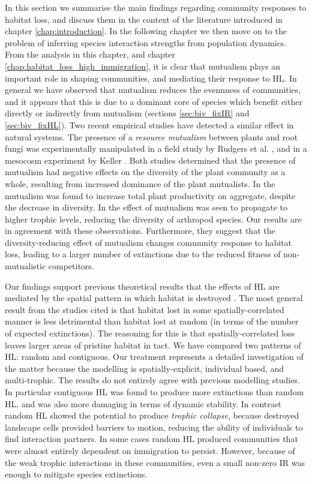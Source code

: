 In this section we summarise the main findings regarding community responses to habitat loss, and discuss them in the context of the literature introduced in chapter \ref{chap:introduction}. In the following chapter we then move on to the problem of inferring species interaction strengths from population dynamics. From the analysis in this chapter, and chapter \ref{chap:habitat_loss_high_immigration}, it is clear that mutualism plays an important role in shaping communities, and mediating their response to HL. In general we have observed that mutualism reduces the evennness of communities, and it appears that this is due to a dominant core of species which benefit either directly or indirectly from mutualism (sections \ref{sec:biv_fixIR} and \ref{sec:biv_fixHL}). Two recent empirical studies have detected a similar effect in natural systems. The presence of a \emph{resource mutualism} between plants and root fungi was experimentally manipulated in a field study by Rudgers et al. \cite{rudgers2008invasive}, and in a mesocosm experiment by Keller \cite{keller2014mutualistic}. Both studies determined that the presence of mutualism had negative effects on the diversity of the plant community as a whole, resulting from increased dominance of the plant mutualists. In \cite{keller2014mutualistic} the mutualism was found to increase total plant productivity on aggregate, despite the decrease in diversity. In \cite{rudgers2008invasive} the effect of mutualism was seen to propagate to higher trophic levels, reducing the diversity of arthropod species. Our results are in agreement with these observations. Furthermore, they suggest that the diversity-reducing effect of mutualism changes community response to habitat loss, leading to a larger number of extinctions due to the reduced fitness of non-mutualistic competitors. 

Our findings support previous theoretical results that the effects of HL are mediated by the spatial pattern in which habitat is destroyed \cite{allen2007self,jager2006simulated,dytham1995effect,
hill1999habitat,travis2003climate,with1999extinction,ovaskainen2002metapopulation}. The most general result from the studies cited is that habitat lost in some spatially-correlated manner is less detrimental than habitat lost at random (in terms of the number of expected extinctions). The reasoning for this is that spatially-correlated loss leaves larger areas of pristine habitat in tact. We have compared two patterns of HL: random and contiguous. Our treatment represents a detailed investigation of the matter because the modelling is spatially-explicit, individual based, and multi-trophic. The results do not entirely agree with previous modelling studies. In particular contiguous HL was found to produce more extinctions than random HL, and was also more damaging in terms of dynamic stability. In contrast random HL showed the potential to produce \emph{trophic collapse}, because destroyed landscape cells provided barriers to motion, reducing the ability of individuals to find interaction partners. In some cases random HL produced communities that were almost entirely dependent on immigration to persist. However, because of the weak trophic interactions in these communities, even a small non-zero IR was enough to mitigate species extinctions.

